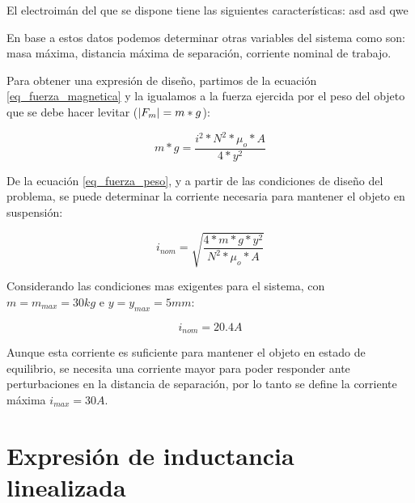\noindent El electroimán del que se dispone tiene las siguientes características:
asd
asd
qwe


\noindent En base a estos datos podemos determinar otras variables del sistema como son: masa máxima, distancia máxima de separación, corriente nominal de trabajo.



\noindent Para obtener una expresión de diseño, partimos de la ecuación \ref{eq_fuerza_magnetica} y la igualamos a la fuerza ejercida por el peso del objeto que se debe hacer levitar ($\lvert F_{m}\rvert=m*g$):

\begin{equation}\label{eq_fuerza_peso}
	m*g=\frac{i^{2}*N^{2}*\mu_{o}*A}{4*y^{2}}
\end{equation}

\noindent De la ecuación \ref{eq_fuerza_peso}, y a partir de las condiciones de diseño del problema, se puede determinar la corriente necesaria para mantener el objeto en suspensión:

\begin{equation} \label{eq_corriente_peso}
	i_{nom}=\sqrt{\frac{4*m*g*y^{2}}{N^{2}*\mu_{o}*A}}
\end{equation}

Considerando las condiciones mas exigentes para el sistema, con $m=m_{max}=30kg$ e $y=y_{max}=5mm$:

\begin{equation}
	i_{nom}=20.4A
\end{equation}

\noindent Aunque esta corriente es suficiente para mantener el objeto en estado de equilibrio, se necesita una corriente mayor para poder responder ante perturbaciones en la distancia de separación, por lo tanto se define la corriente máxima $i_{max}=30A$.



\section{Expresión de inductancia linealizada}

